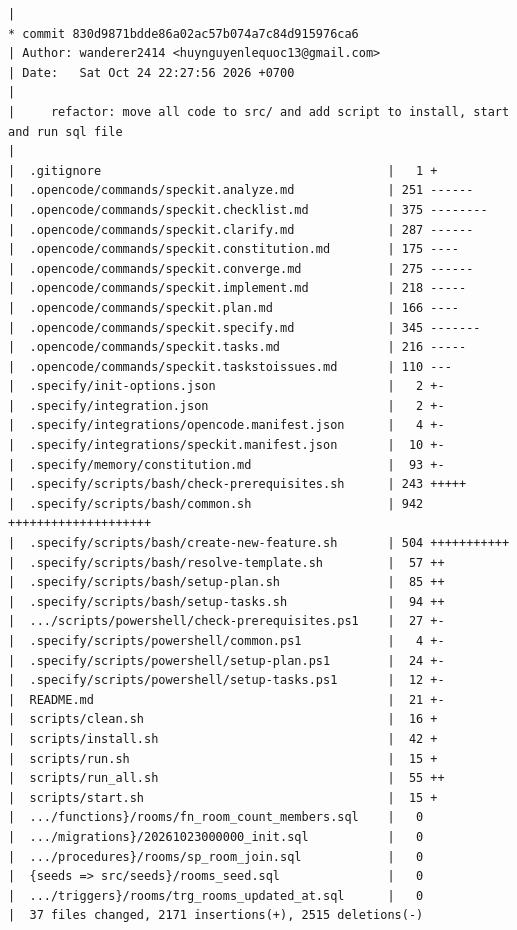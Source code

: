 \documentclass[12pt]{article}
\begin{document}
\begin{lstlisting}[numbers=none,breaklines=true]
|
* commit 830d9871bdde86a02ac57b074a7c84d915976ca6
| Author: wanderer2414 <huynguyenlequoc13@gmail.com>
| Date:   Sat Oct 24 22:27:56 2026 +0700
|
|     refactor: move all code to src/ and add script to install, start and run sql file
|
|  .gitignore                                        |   1 +
|  .opencode/commands/speckit.analyze.md             | 251 ------
|  .opencode/commands/speckit.checklist.md           | 375 --------
|  .opencode/commands/speckit.clarify.md             | 287 ------
|  .opencode/commands/speckit.constitution.md        | 175 ----
|  .opencode/commands/speckit.converge.md            | 275 ------
|  .opencode/commands/speckit.implement.md           | 218 -----
|  .opencode/commands/speckit.plan.md                | 166 ----
|  .opencode/commands/speckit.specify.md             | 345 -------
|  .opencode/commands/speckit.tasks.md               | 216 -----
|  .opencode/commands/speckit.taskstoissues.md       | 110 ---
|  .specify/init-options.json                        |   2 +-
|  .specify/integration.json                         |   2 +-
|  .specify/integrations/opencode.manifest.json      |   4 +-
|  .specify/integrations/speckit.manifest.json       |  10 +-
|  .specify/memory/constitution.md                   |  93 +-
|  .specify/scripts/bash/check-prerequisites.sh      | 243 +++++
|  .specify/scripts/bash/common.sh                   | 942 ++++++++++++++++++++
|  .specify/scripts/bash/create-new-feature.sh       | 504 +++++++++++
|  .specify/scripts/bash/resolve-template.sh         |  57 ++
|  .specify/scripts/bash/setup-plan.sh               |  85 ++
|  .specify/scripts/bash/setup-tasks.sh              |  94 ++
|  .../scripts/powershell/check-prerequisites.ps1    |  27 +-
|  .specify/scripts/powershell/common.ps1            |   4 +-
|  .specify/scripts/powershell/setup-plan.ps1        |  24 +-
|  .specify/scripts/powershell/setup-tasks.ps1       |  12 +-
|  README.md                                         |  21 +-
|  scripts/clean.sh                                  |  16 +
|  scripts/install.sh                                |  42 +
|  scripts/run.sh                                    |  15 +
|  scripts/run_all.sh                                |  55 ++
|  scripts/start.sh                                  |  15 +
|  .../functions}/rooms/fn_room_count_members.sql    |   0
|  .../migrations}/20261023000000_init.sql           |   0
|  .../procedures}/rooms/sp_room_join.sql            |   0
|  {seeds => src/seeds}/rooms_seed.sql               |   0
|  .../triggers}/rooms/trg_rooms_updated_at.sql      |   0
|  37 files changed, 2171 insertions(+), 2515 deletions(-)

\end{lstlisting}
\end{document}
